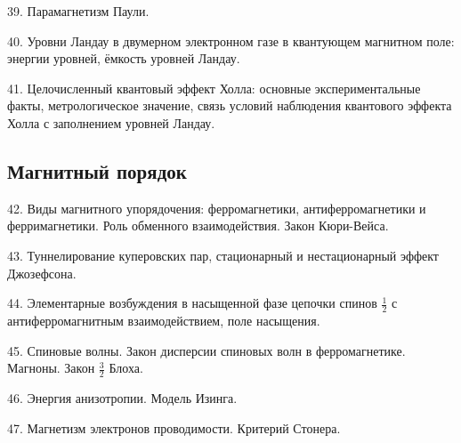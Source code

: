 39. Парамагнетизм Паули.

40. Уровни Ландау в двумерном электронном газе в квантующем магнитном поле: энергии уровней, ёмкость уровней Ландау.

41. Целочисленный квантовый эффект Холла: основные экспериментальные факты, метрологическое значение, связь условий наблюдения квантового эффекта Холла с заполнением уровней Ландау.



\subsection*{Магнитный порядок}

42. Виды магнитного упорядочения: ферромагнетики, антиферромагнетики и ферримагнетики. Роль обменного взаимодействия. Закон Кюри-Вейса.

43. Туннелирование куперовских пар, стационарный и нестационарный эффект Джозефсона.

44. Элементарные возбуждения в насыщенной фазе цепочки спинов $\frac{1}{2}$ с антиферромагнитным взаимодействием, поле насыщения.

45. Спиновые волны. Закон дисперсии спиновых волн в ферромагнетике. Магноны. Закон $\frac{3}{2}$ Блоха.

46. Энергия анизотропии. Модель Изинга.

47. Магнетизм электронов проводимости. Критерий Стонера.	